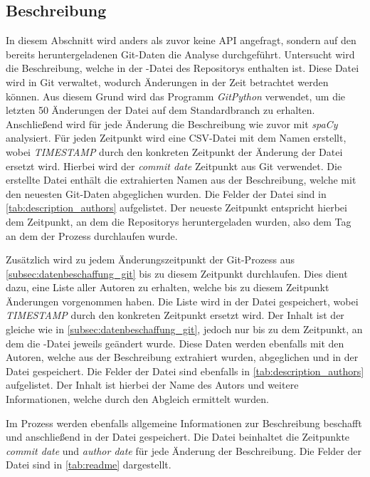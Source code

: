 \subsection{Beschreibung}
\label{subsec:datenbeschaffung_beschreibung}
In diesem Abschnitt wird anders als zuvor keine API angefragt, sondern auf den bereits heruntergeladenen Git-Daten die Analyse durchgeführt.
Untersucht wird die Beschreibung, welche in der -Datei des Repositorys enthalten ist.
Diese Datei wird in Git verwaltet, wodurch Änderungen in der Zeit betrachtet werden können.
Aus diesem Grund wird das Programm \emph{GitPython} verwendet, um die letzten 50 Änderungen der Datei auf dem Standardbranch zu erhalten.
Anschließend wird für jede Änderung die Beschreibung wie zuvor mit \emph{spaCy} analysiert.
Für jeden Zeitpunkt wird eine CSV-Datei mit dem Namen  erstellt, wobei \emph{TIMESTAMP} durch den konkreten Zeitpunkt der Änderung der Datei ersetzt wird.
Hierbei wird der \emph{commit date} Zeitpunkt aus Git verwendet.
Die erstellte Datei enthält die extrahierten Namen aus der Beschreibung, welche mit den neuesten Git-Daten abgeglichen wurden.
Die Felder der Datei sind in \autoref{tab:description_authors} aufgelistet.
Der neueste Zeitpunkt entspricht hierbei dem Zeitpunkt, an dem die Repositorys heruntergeladen wurden, also dem Tag an dem der Prozess durchlaufen wurde.

Zusätzlich wird zu jedem Änderungszeitpunkt der Git-Prozess aus \autoref{subsec:datenbeschaffung_git} bis zu diesem Zeitpunkt durchlaufen.
Dies dient dazu, eine Liste aller Autoren zu erhalten, welche bis zu diesem Zeitpunkt Änderungen vorgenommen haben.
Die Liste wird in der Datei  gespeichert, wobei \emph{TIMESTAMP} durch den konkreten Zeitpunkt ersetzt wird.
Der Inhalt ist der gleiche wie in \autoref{subsec:datenbeschaffung_git}, jedoch nur bis zu dem Zeitpunkt, an dem die -Datei jeweils geändert wurde.
Diese Daten werden ebenfalls mit den Autoren, welche aus der Beschreibung extrahiert wurden, abgeglichen und in der Datei  gespeichert.
Die Felder der Datei sind ebenfalls in \autoref{tab:description_authors} aufgelistet.
Der Inhalt ist hierbei der Name des Autors und weitere Informationen, welche durch den Abgleich ermittelt wurden.

Im Prozess werden ebenfalls allgemeine Informationen zur Beschreibung beschafft und anschließend in der Datei  gespeichert.
Die Datei beinhaltet die Zeitpunkte \emph{commit date} und \emph{author date} für jede Änderung der Beschreibung.
Die Felder der Datei sind in \autoref{tab:readme} dargestellt.

